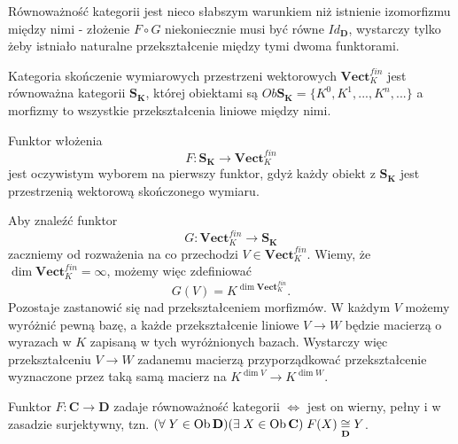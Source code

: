 Równoważność kategorii jest nieco słabszym warunkiem niż istnienie izomorfizmu między nimi - złożenie $F\circ G$ niekoniecznie musi być równe $Id_{\mathbf{D}}$, wystarczy tylko żeby istniało naturalne przekształcenie między tymi dwoma funktorami.

\begin{example}
\item Kategoria skończenie wymiarowych przestrzeni wektorowych $\mathbf{Vect}_K^{fin}$ jest równoważna kategorii $\mathbf{S_K}$, której obiektami są $Ob\mathbf{S_K}=\{K^0,K^1,...,K^n,...\}$ a morfizmy to wszystkie przekształcenia liniowe między nimi.

  Funktor włożenia
  $$F:\mathbf{S_K}\to \mathbf{Vect}_K^{fin}$$
  jest oczywistym wyborem na pierwszy funktor, gdyż każdy obiekt z $\mathbf{S_K}$ jest przestrzenią wektorową skończonego wymiaru.

  Aby znaleźć funktor
  $$G:\mathbf{Vect}_K^{fin}\to\mathbf{S_K}$$
  zaczniemy od rozważenia na co przechodzi $V\in\mathbf{Vect}_K^{fin}$. Wiemy, że $\dim\mathbf{Vect}_K^{fin}=\infty$, możemy więc zdefiniować
  $$G(V)=K^{\dim\mathbf{Vect}_K^{fin}}.$$
  Pozostaje zastanowić się nad przekształceniem morfizmów. W każdym $V$ możemy wyróżnić pewną bazę, a każde przekształcenie liniowe $V\to W$ będzie macierzą o wyrazach w $K$ zapisaną w tych wyróżnionych bazach. Wystarczy więc przekształceniu $V\to W$ zadanemu macierzą przyporządkować przekształcenie wyznaczone przez taką samą macierz na $K^{\dim V}\to K^{\dim W}$.

\end{example}

\begin{theorem}
  Funktor $F:\mathbf{C}\to \mathbf{D}$ zadaje równoważność kategorii $\iff$ jest on wierny, pełny i w zasadzie surjektywny, tzn. $(\forall\;Y\in \operatorname{Ob}\mathbf{D})(\exists\;X\in \operatorname{Ob}\mathbf{C})\;F(X)\underset{\mathbf{D}}{\cong}Y$.
\end{theorem}

